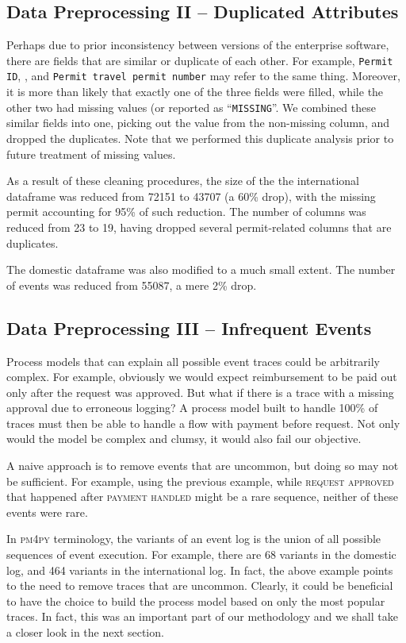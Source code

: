 \documentclass[conference]{IEEEtran}
\begin{document}
\subsection{Data Preprocessing II -- Duplicated Attributes}

Perhaps due to prior inconsistency between
versions of the enterprise software, there are fields that are similar
or duplicate of each other. For example, \texttt{Permit ID}, ,
and \texttt{Permit travel permit number} may refer to the same thing.
Moreover, it is more than likely that exactly one of the three fields were
filled, while the other two had missing values (or reported as
``\texttt{MISSING}''. We combined these similar fields into one, picking out
the value from the non-missing column, and dropped the duplicates. Note that 
we performed this duplicate analysis prior to future treatment of missing
values.

As a result of these cleaning procedures, the size of the
the international dataframe was reduced from 72151 to 43707 (a 60\% drop),
with the
missing permit accounting for 95\% of such reduction. The number of
columns was reduced from 23 to 19, having dropped
several permit-related columns that are duplicates.

The domestic dataframe was also modified to a much small extent. The
number of events was reduced from 55087, a mere 2\% drop.

\subsection{Data Preprocessing III -- Infrequent Events}

Process models that can explain all possible event traces could be
arbitrarily complex. For example, obviously we would expect reimbursement to
be paid out only after the request was approved. But what if there is
a trace with a missing approval due to erroneous logging? A process model
built to handle 100\% of traces must then be able to handle a flow with
payment before request. Not only would the model be complex and clumsy,
it would also fail our objective.

A naive approach is to remove events that are uncommon, but doing so may
not be sufficient. For example, using the previous example,
while \textsc{request approved} that happened after \textsc{payment handled}
might be a rare sequence, neither of these events were rare.

In \textsc{pm4py} terminology, the variants of an event log is the
union of all possible sequences of event execution. For example, there are
68 variants in the domestic log, and 464 variants in the international log.
In fact, the above example
points to the need to remove traces that are uncommon. Clearly, it could
be beneficial to have the choice to build the process model based on
only the most popular traces. In fact, this was an important part of our
methodology and we shall take a closer look in the next section.
\end{document}

